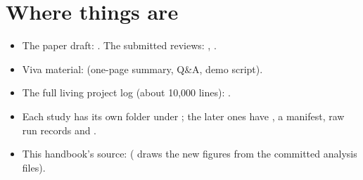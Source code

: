 \section*{Where things are}
\begin{itemize}
\item The paper draft: . The submitted reviews: , .
\item Viva material:  (one-page summary, Q\&A, demo script).
\item The full living project log (about 10{,}000 lines): .
\item Each study has its own folder under ; the later ones have , a manifest, raw run records and .
\item This handbook's source:  ( draws the new figures from the committed analysis files).
\end{itemize}
